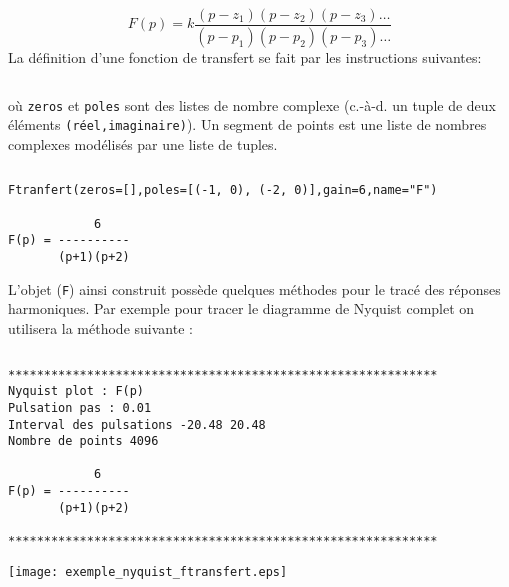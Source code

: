 \[
F(p)=k\dfrac{(p-z_1)(p-z_2)(p-z_3)\ldots}{(p-p_1)(p-p_2)(p-p_3)\ldots}
\]
La définition d'une fonction de transfert se fait par les instructions
suivantes:
\inputminted{python}{codes/python/annexe_cauchy_cellule2.py}
où \texttt{zeros} et \texttt{poles} sont des listes de nombre complexe 
(c.-à-d. un tuple de deux éléments \texttt{(réel,imaginaire)}).
Un segment de points est une liste de nombres complexes modélisés par 
une liste de tuples.
\begin{tcolorbox}[breakable, size=fbox, boxrule=1pt, 
pad at break*=1mm,colback=cellbackground, colframe=cellborder]
\inputminted{python}{codes/python/annexe_cauchy_cellule2.py}
\end{tcolorbox}
\begin{Verbatim}[commandchars=\\\{\}]
Ftranfert(zeros=[],poles=[(-1, 0), (-2, 0)],gain=6,name="F")

            6
F(p) = ----------
       (p+1)(p+2)

\end{Verbatim}

L'objet (\texttt{F}) ainsi construit possède quelques méthodes pour
le tracé des réponses harmoniques. Par exemple pour tracer le diagramme de 
Nyquist complet on utilisera la méthode suivante :
\begin{tcolorbox}[breakable, size=fbox, boxrule=1pt, 
    pad at break*=1mm,colback=cellbackground, colframe=cellborder]
\inputminted{python}{codes/python/annexe_cauchy_cellule3.py}
\end{tcolorbox}

\begin{Verbatim}[commandchars=\\\{\}]
************************************************************
Nyquist plot : F(p)
Pulsation pas : 0.01
Interval des pulsations -20.48 20.48
Nombre de points 4096

            6
F(p) = ----------
       (p+1)(p+2)

************************************************************
\end{Verbatim}
\begin{center}
    \texttt{[image: exemple\_nyquist\_ftransfert.eps]}
\end{center}
